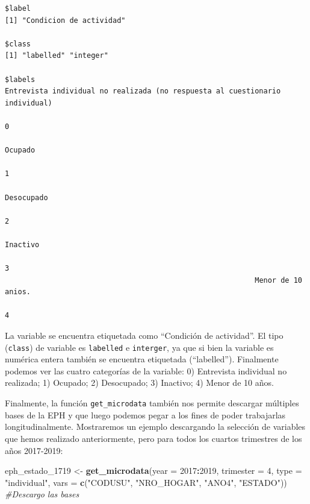 \documentclass[
]{article}
\newenvironment{Shaded}{\begin{snugshade}}{\end{snugshade}}
\newcommand{\AttributeTok}[1]{\textcolor[rgb]{0.13,0.29,0.53}{#1}}
\newcommand{\CommentTok}[1]{\textcolor[rgb]{0.56,0.35,0.01}{\textit{#1}}}
\newcommand{\DecValTok}[1]{\textcolor[rgb]{0.00,0.00,0.81}{#1}}
\newcommand{\FunctionTok}[1]{\textcolor[rgb]{0.13,0.29,0.53}{\textbf{#1}}}
\newcommand{\NormalTok}[1]{#1}
\newcommand{\OtherTok}[1]{\textcolor[rgb]{0.56,0.35,0.01}{#1}}
\newcommand{\SpecialCharTok}[1]{\textcolor[rgb]{0.81,0.36,0.00}{\textbf{#1}}}
\newcommand{\StringTok}[1]{\textcolor[rgb]{0.31,0.60,0.02}{#1}}
\begin{document}
\begin{verbatim}
$label
[1] "Condicion de actividad"

$class
[1] "labelled" "integer" 

$labels
Entrevista individual no realizada (no respuesta al cuestionario individual) 
                                                                           0 
                                                                     Ocupado 
                                                                           1 
                                                                  Desocupado 
                                                                           2 
                                                                    Inactivo 
                                                                           3 
                                                          Menor de 10 anios. 
                                                                           4 
\end{verbatim}

La variable se encuentra etiquetada como ``Condición de actividad''. El tipo (\texttt{class}) de variable es \texttt{labelled} e \texttt{interger}, ya que si bien la variable es numérica entera también se encuentra etiquetada (``labelled''). Finalmente podemos ver las cuatro categorías de la variable: 0) Entrevista individual no realizada; 1) Ocupado; 2) Desocupado; 3) Inactivo; 4) Menor de 10 años.

Finalmente, la función \texttt{get\_microdata} también nos permite descargar múltiples bases de la EPH y que luego podemos pegar a los fines de poder trabajarlas longitudinalmente. Mostraremos un ejemplo descargando la selección de variables que hemos realizado anteriormente, pero para todos los cuartos trimestres de los años 2017-2019:

\begin{Shaded}
\begin{Highlighting}[]
\NormalTok{eph\_estado\_1719 }\OtherTok{\textless{}{-}} \FunctionTok{get\_microdata}\NormalTok{(}\AttributeTok{year =} \DecValTok{2017}\SpecialCharTok{:}\DecValTok{2019}\NormalTok{, }\AttributeTok{trimester =} \DecValTok{4}\NormalTok{, }\AttributeTok{type =} \StringTok{"individual"}\NormalTok{,}
    \AttributeTok{vars =} \FunctionTok{c}\NormalTok{(}\StringTok{"CODUSU"}\NormalTok{, }\StringTok{"NRO\_HOGAR"}\NormalTok{, }\StringTok{"ANO4"}\NormalTok{, }\StringTok{"ESTADO"}\NormalTok{))  }\CommentTok{\#Descargo las bases}
\end{Highlighting}
\end{Shaded}
\end{document}
